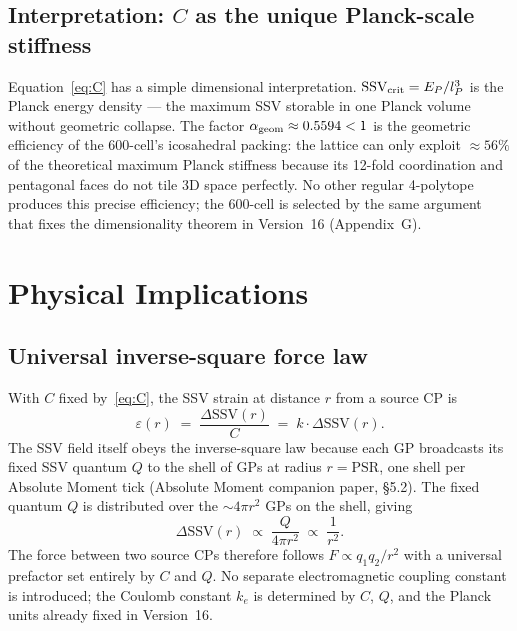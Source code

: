 \documentclass[12pt]{article}
\newcommand{\lP}{l_P}
\newcommand{\EP}{E_P}
\newcommand{\SSV}{\text{SSV}}
\newcommand{\PSR}{\text{PSR}}
\newcommand{\alphageom}{\alpha_{\rm geom}}
\newcommand{\SSVcrit}{\SSV_{\rm crit}}
\begin{document}
\subsection{Interpretation: $C$ as the unique Planck-scale stiffness}

Equation~\eqref{eq:C} has a simple dimensional interpretation.
$\SSVcrit = \EP/\lP^3$ is the Planck energy density --- the maximum
SSV storable in one Planck volume without geometric collapse.
The factor $\alphageom \approx 0.5594 < 1$ is the geometric efficiency
of the 600-cell's icosahedral packing: the lattice can only exploit
$\approx 56\%$ of the theoretical maximum Planck stiffness because its
12-fold coordination and pentagonal faces do not tile 3D space perfectly.
No other regular 4-polytope produces this precise efficiency; the 600-cell
is selected by the same argument that fixes the dimensionality theorem in
Version~16 (Appendix~G).

\section{Physical Implications}
\label{sec:implications}

\subsection{Universal inverse-square force law}

With $C$ fixed by~\eqref{eq:C}, the SSV strain at distance $r$ from a
source CP is
\begin{equation}
  \varepsilon(r) \;=\; \frac{\Delta\SSV(r)}{C}
  \;=\; k\cdot\Delta\SSV(r).
  \label{eq:strain}
\end{equation}
The SSV field itself obeys the inverse-square law because each GP broadcasts
its fixed SSV quantum $Q$ to the shell of GPs at radius $r = \PSR$, one shell
per Absolute Moment tick (Absolute Moment companion paper, \S 5.2).
The fixed quantum $Q$ is distributed over the $\sim 4\pi r^2$ GPs on the
shell, giving
\begin{equation}
  \Delta\SSV(r) \;\propto\; \frac{Q}{4\pi r^2}
  \;\propto\; \frac{1}{r^2}.
  \label{eq:invsq}
\end{equation}
The force between two source CPs therefore follows $F \propto q_1 q_2/r^2$
with a universal prefactor set entirely by $C$ and $Q$.  No separate
electromagnetic coupling constant is introduced; the Coulomb constant $k_e$
is determined by $C$, $Q$, and the Planck units already fixed in Version~16.
\end{document}
